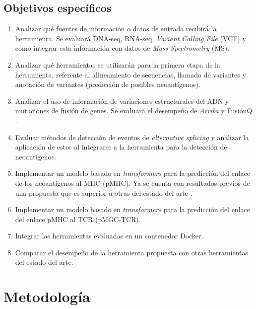 \documentclass[a4paper,11pt]{article}
\begin{document}
	\subsection{Objetivos específicos}
	\begin{enumerate}
		\item Analizar qué fuentes de información o datos de entrada recibirá la herramienta. Se evaluará DNA-seq, RNA-seq, \textit{Variant Calling File} (VCF) y como integrar esta información con datos de \textit{Mass Spectrometry} (MS).
		
		\item Analizar qué herramientas se utilizarán para la primera etapa de la herramienta, referente al alineamiento de secuencias, llamado de variantes y  anotación de variantes (predicción de posibles neoantígenos). 
		
		\item Analizar el uso de información de variaciones estructurales del ADN y mutaciones de fusión de genes. Se evaluará el desempeño de \textit{Arriba} \citep{uhrig2021accurate} y FusionQ \citep{liu2013fusionq}.

        \item Evaluar métodos de detección de eventos de \textit{alternative splicing} y analizar la aplicación de estos al integrarse a la herramienta para la detección de neoantígenos.
		 
		\item Implementar un modelo basado en \textit{transformers} para la predicción del enlace de los neoantígenos al MHC (pMHC). Ya se cuenta con resultados previos de una propuesta que es superior a otras del estado del arte \citep{arceda2023neoantigen}.

        \item Implementar un modelo basado en \textit{transformers} para la predicción del enlace del enlace pMHC al TCR (pMGC-TCR). 
       
	\item Integrar las herramientas evaluadas en un contenedor Docker.
		
        \item Comparar el desempeño de la herramienta propuesta con otras herramientas del estado del arte.

		
	\end{enumerate}







\section{Metodología} 
\end{document}

